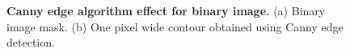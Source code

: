 \begin{figure}[!ht]
    \centering
    \begin{subfigure}[b]{.45\linewidth}
        \caption{}\label{canny-mask}
    \end{subfigure}
    \hspace{1em}
    \begin{subfigure}[b]{.45\linewidth}
        \caption{}\label{canny-contour}
    \end{subfigure}
    \caption{\textbf{Canny edge algorithm effect for binary image.} (a) Binary image mask. (b) One pixel wide contour obtained using Canny edge detection.}
    \label{canny-imgs}
\end{figure}

